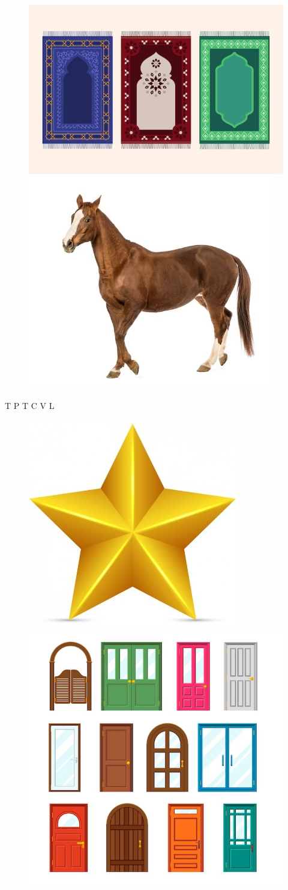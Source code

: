 \begin{figure}[htpb!]
\includegraphics[width=.5\textwidth]{media/image1.jpeg}
\includegraphics[width=.5\textwidth]{media/image2.jpeg}
\end{figure}

T  P  T \hspace{6cm} C  V  L 


\begin{figure}[htpb!]
\includegraphics[width=.5\textwidth]{media/image3.jpeg}
\includegraphics[width=.5\textwidth]{media/image4.jpeg}
\end{figure}

